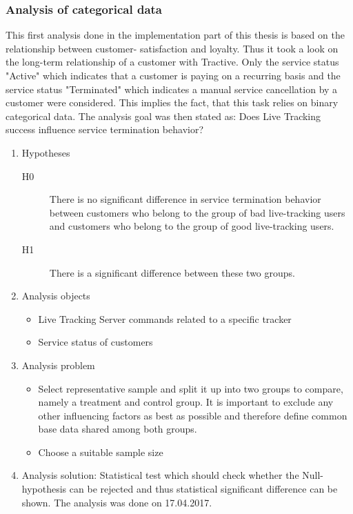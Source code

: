 \subsubsection{Analysis of categorical data}
This first analysis done in the implementation part of this thesis is based on the relationship between customer- satisfaction and loyalty. Thus it took a look on the long-term relationship of a customer with Tractive. Only the service status "Active" which indicates that a customer is paying on a recurring basis and the service status "Terminated" which indicates a manual service cancellation by a customer were considered. This implies the fact, that this task relies on binary categorical data. The analysis goal was then stated as: Does Live Tracking success influence service termination behavior? 

\begin{enumerate}
	\item Hypotheses
	\begin{description}
		\item[H0] There is no significant difference in service termination behavior between customers who belong to the group of bad live-tracking users and customers who belong to the group of good live-tracking users.
		\item[H1] There is a significant difference between these two groups.
	\end{description}
	\item Analysis objects
	\begin{itemize}
		\item Live Tracking Server commands related to a specific tracker
		\item Service status of customers
	\end{itemize}
	\item Analysis problem
	\begin{itemize}
		\item Select representative sample and split it up into two groups to compare, namely a treatment and control group.  It is important to exclude any other influencing factors as best as possible and therefore define common base data shared among both groups. 
		\item Choose a suitable sample size
	\end{itemize}
	\item Analysis solution: Statistical test which should check whether the Null-hypothesis can be rejected and thus statistical significant difference can be shown. The analysis was done on 17.04.2017. 

\end{enumerate}

